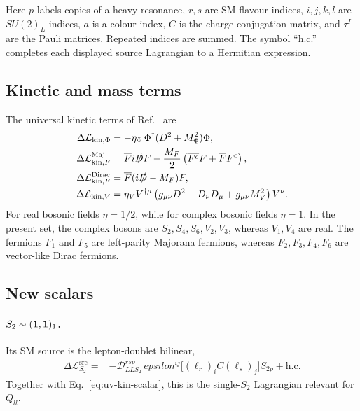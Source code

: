 Here $p$ labels copies of a heavy resonance, $r,s$ are SM flavour indices,
$i,j,k,l$ are $SU(2)_L$ indices, $a$ is a colour index, $C$ is the charge
conjugation matrix, and $\tau^I$ are the Pauli matrices.  Repeated indices are
summed.  The symbol ``h.c.'' completes each displayed source Lagrangian to a
Hermitian expression.

\subsection{Kinetic and mass terms}

The universal kinetic terms of Ref.~\cite{li2024complete} are
\begin{align}
    \Delta\mathcal L_{\mathrm{kin},\Phi}
        &= -\eta_\Phi\,\Phi^\dagger(D^2+M_\Phi^2)\Phi,
        \label{eq:uv-kin-scalar}\\
    \Delta\mathcal L_{\mathrm{kin},F}^{\mathrm{Maj}}
        &= \overline F i\slashed D F
        -\frac{M_F}{2}\left(\overline{F^c}F+\overline F F^c\right),
        \label{eq:uv-kin-majorana}\\
    \Delta\mathcal L_{\mathrm{kin},F}^{\mathrm{Dirac}}
        &= \overline F(i\slashed D-M_F)F,
        \label{eq:uv-kin-dirac}\\
    \Delta\mathcal L_{\mathrm{kin},V}
        &= \eta_V V^{\dagger\mu}
        \left(g_{\mu\nu}D^2-D_\nu D_\mu+g_{\mu\nu}M_V^2\right)V^\nu.
        \label{eq:uv-kin-vector}
\end{align}
For real bosonic fields $\eta=1/2$, while for complex bosonic fields
$\eta=1$.  In the present set, the complex bosons are
$S_2,S_4,S_6,V_2,V_3$, whereas $V_1,V_4$ are real.
The fermions $F_1$ and $F_5$ are left-parity Majorana fermions, whereas
$F_2,F_3,F_4,F_6$ are vector-like Dirac fermions.

\subsection{New scalars}

\paragraph{$S_2\sim({\bf1},{\bf1})_1$.}
Its SM source is the lepton-doublet bilinear,
\begin{align}
    \Delta\mathcal L_{S_2}^{\mathrm{src}}
    ={}&-\mathcal D_{LLS_2}^{rsp}\,epsilon^{ij}
        \big[(\ell_r)_i C(\ell_s)_j\big]S_{2p}
        +\mathrm{h.c.}
    \label{eq:uv-lag-S2}
\end{align}
Together with Eq.~\eqref{eq:uv-kin-scalar}, this is the single-$S_2$
Lagrangian relevant for $Q_{ll}$.

